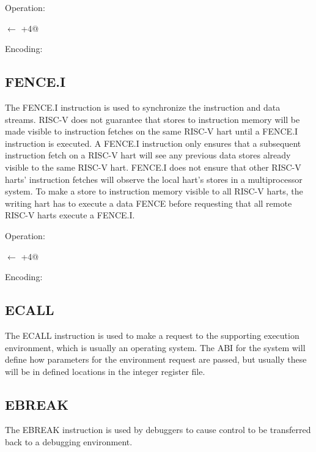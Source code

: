 Operation:

\verb@pc@ $\leftarrow$ \verb@pc+4@

Encoding:


\subsection{FENCE.I}

The FENCE.I instruction is used to synchronize the instruction and 
data streams. RISC-V does not guarantee that stores to instruction 
memory will be made visible to instruction fetches on the same
RISC-V hart until a FENCE.I instruction is executed. A FENCE.I 
instruction only ensures that a subsequent instruction fetch on 
a RISC-V hart will see any previous data stores already visible to 
the same RISC-V hart. FENCE.I does not ensure that other RISC-V harts' 
instruction fetches will observe the local hart's stores in a 
multiprocessor system. To make a store to instruction memory
visible to all RISC-V harts, the writing hart has to execute a 
data FENCE before requesting that all remote RISC-V harts execute 
a FENCE.I.~\cite[p.~21]{rvismv1v22:2017}

Operation:

\verb@pc@ $\leftarrow$ \verb@pc+4@

Encoding:



\subsection{ECALL}

The ECALL instruction is used to make a request to the supporting 
execution environment, which is usually an operating system. The ABI 
for the system will define how parameters for the environment
request are passed, but usually these will be in defined locations 
in the integer register file.~\cite[p.~24]{rvismv1v22:2017}



\subsection{EBREAK}

The EBREAK instruction is used by debuggers to cause control to be 
transferred back to a debugging environment.~\cite[p.~24]{rvismv1v22:2017}



